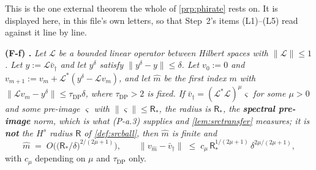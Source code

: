 
\begin{remark}\label{rem:ff}
This is the one external theorem the whole of \cref{prp:phirate} rests on. It is displayed here, in
this file's own letters, so that Step~2's items \textup{(L1)--(L5)} read against it line by line.

\smallskip
\noindent\textbf{(F-f) \citep[Thm.~6.5]{engl2000}.} \emph{Let $\mathcal L$ be a bounded linear operator
between Hilbert spaces with $\|\mathcal L\|\le1$. Let $y:=\mathcal L\bar v_\dagger$ and let $y^\delta$
satisfy $\|y^\delta-y\|\le\delta$. Let $v_0:=0$ and
$v_{m+1}:=v_m+\mathcal L^{\ast}(y^\delta-\mathcal Lv_m)$, and let $\hat m$ be the first index $m$ with
$\|\mathcal Lv_m-y^\delta\|\le\tau_{\mathrm{DP}}\delta$, where $\tau_{\mathrm{DP}}>2$ is fixed. If
$\bar v_\dagger=(\mathcal L^{\ast}\mathcal L)^{\mu}\varsigma$ for some $\mu>0$ and some pre-image
$\varsigma$ with $\|\varsigma\|\le\mathsf R_\ast$, \emph{the radius is $\mathsf R_\ast$, the
\textbf{spectral pre-image} norm, which is what (P-a.3) supplies and \cref{lem:srctransfer} measures;
it is \textbf{not} the $H^{s}$ radius $\mathsf R$ of \cref{def:srcball}}, then $\hat m$ is finite and}
\begin{equation}\label{eq:ff}
\hat m\;=\;O\Big(\big(\mathsf R_\ast/\delta\big)^{2/(2\mu+1)}\Big) ,
\qquad
\big\|v_{\hat m}-\bar v_\dagger\big\|\;\le\;c_\mu\,\mathsf R_\ast^{1/(2\mu+1)}\,\delta^{2\mu/(2\mu+1)} ,
\end{equation}
with $c_\mu$ depending on $\mu$ and $\tau_{\mathrm{DP}}$ only.


\end{remark}
